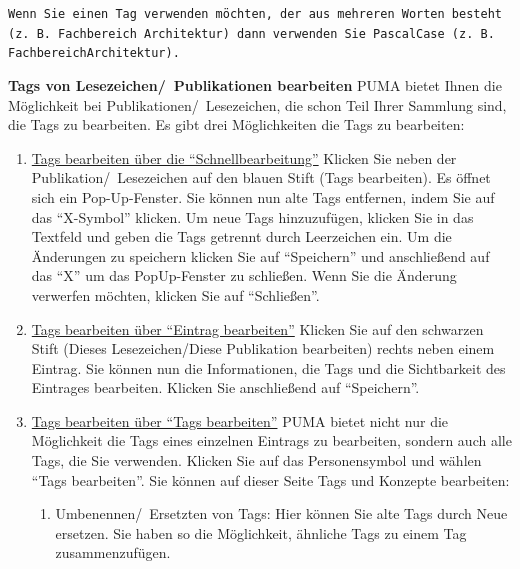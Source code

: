 \begin{mdframed}
[style=mdfexample1,frametitle={\texttt{TIPP}},backgroundcolor=gray!40]
\texttt{Wenn Sie einen Tag verwenden möchten, der aus mehreren Worten besteht (z.~B. Fachbereich Architektur) dann verwenden Sie PascalCase (z.~B. FachbereichArchitektur).} 
\end{mdframed}
\textbf{Tags von Lesezeichen/~Publikationen bearbeiten} \newline
PUMA bietet Ihnen die Möglichkeit bei Publikationen/~Lesezeichen, die schon Teil Ihrer Sammlung sind, die Tags zu bearbeiten. Es gibt drei Möglichkeiten die Tags zu bearbeiten:
\begin{enumerate}
    \item \underline{Tags bearbeiten über die \enquote{Schnellbearbeitung}}\newline
    Klicken Sie neben der Publikation/~Lesezeichen auf den blauen Stift (Tags bearbeiten). Es öffnet sich ein Pop-Up-Fenster. Sie können nun alte Tags entfernen, indem Sie auf das \enquote{X-Symbol} klicken. Um neue Tags hinzuzufügen, klicken Sie in das Textfeld und geben die Tags getrennt durch Leerzeichen ein. Um die Änderungen zu speichern klicken Sie auf \enquote{Speichern} und anschließend auf das \enquote{X} um das PopUp-Fenster zu schließen. Wenn Sie die Änderung verwerfen möchten, klicken Sie auf \enquote{Schließen}.
    \item \underline{Tags bearbeiten über \enquote{Eintrag bearbeiten}}\newline
    Klicken Sie auf den schwarzen Stift (Dieses Lesezeichen/Diese Publikation bearbeiten) rechts neben einem Eintrag. Sie können nun die Informationen, die Tags und die Sichtbarkeit des Eintrages bearbeiten. Klicken Sie anschließend auf \enquote{Speichern}.
    \item \underline{Tags bearbeiten über \enquote{Tags bearbeiten}}\newline
    PUMA bietet nicht nur die Möglichkeit die Tags eines einzelnen Eintrags zu bearbeiten, sondern auch alle Tags, die Sie verwenden. Klicken Sie auf das Personensymbol und wählen \enquote{Tags bearbeiten}. Sie können auf dieser Seite Tags und Konzepte bearbeiten:
    \begin{enumerate}
        \item Umbenennen/~Ersetzten von Tags: \newline Hier können Sie alte Tags durch Neue ersetzen. Sie haben so die Möglichkeit, ähnliche Tags zu einem Tag zusammenzufügen.

\end{enumerate}
\end{enumerate}
